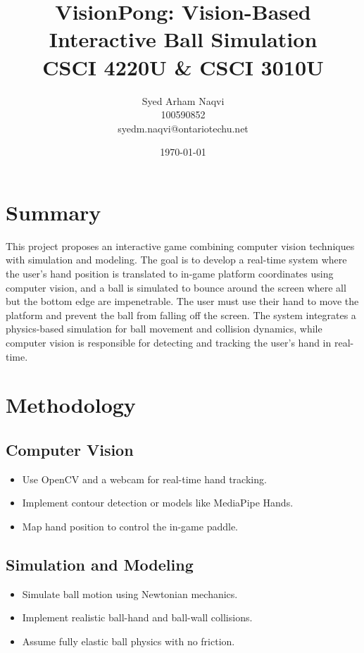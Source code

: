 \documentclass{article}
\title{\textbf{VisionPong: Vision-Based Interactive Ball Simulation}\\ \LARGE{CSCI 4220U \& CSCI 3010U}}
\author{Syed Arham Naqvi \\ 100590852 \\ syedm.naqvi@ontariotechu.net}
\date{\today}
\begin{document}
\maketitle

\section*{\Large{Summary}}
This project proposes an interactive game combining computer vision techniques with simulation and modeling. The goal is to develop a real-time system where the user's hand position is translated to
in-game platform coordinates using computer vision, and a ball is simulated to bounce around the screen where all but the bottom edge are impenetrable. The user must use their hand to move the platform and prevent the ball
from falling off the screen. The system integrates a physics-based simulation for ball movement and collision dynamics, while computer vision is responsible for detecting and tracking the user's hand in real-time.

\vspace*{5pt}

\section*{\Large{Methodology}}

\begin{center}
    \begin{minipage}[t]{0.48\textwidth}
        \subsection*{\large{Computer Vision}}
        \begin{itemize}
            \item Use OpenCV and a webcam for real-time hand tracking.
            \item Implement contour detection or models like MediaPipe Hands.
            \item Map hand position to control the in-game paddle.
        \end{itemize}
    \end{minipage}
    \begin{minipage}[t]{0.48\textwidth}
        \subsection*{\large{Simulation and Modeling}}
        \begin{itemize}
            \item Simulate ball motion using Newtonian mechanics.
            \item Implement realistic ball-hand and ball-wall collisions.
            \item Assume fully elastic ball physics with no friction.
        \end{itemize}
    \end{minipage}
\end{center}
\end{document}
